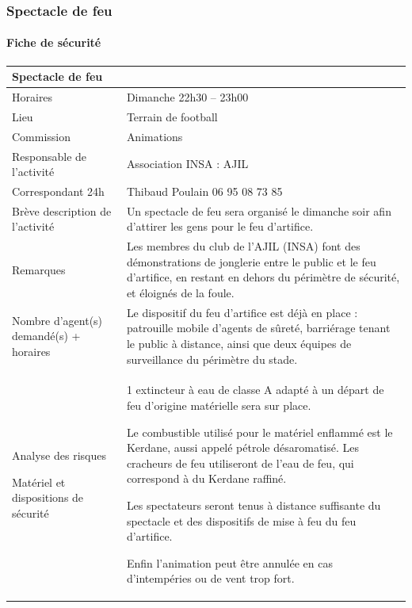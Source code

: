 \documentclass[hidelinks, paper=a4, fontsize=13pt]{report}
\begin{document}
\newpage

\subsubsection{Spectacle de feu}

\paragraph{Fiche de sécurité}
\begin{center}

\begin{tabular}{ | p{6cm} | p{10cm} | }
\hline
	\multicolumn{2}{|l|}{Spectacle de feu}  \\ \hline
	Horaires & Dimanche 22h30 – 23h00 \\ \hline
	Lieu & Terrain de football \\ \hline
	Commission & Animations \\ \hline
	Responsable de l'activité & Association INSA : AJIL \\ \hline
	Correspondant 24h & Thibaud Poulain 06 95 08 73 85 \\ \hline
	Brève description de l'activité & Un spectacle de feu sera organisé le dimanche soir afin d’attirer les gens pour le feu d’artifice. \\ \hline
	Remarques & Les membres du club de l’AJIL (INSA) font des démonstrations de jonglerie entre le public et le feu d’artifice, en restant en dehors du périmètre de sécurité, et éloignés de la foule. \\ \hline
	Nombre d’agent(s) demandé(s) + horaires
 & Le dispositif du feu d’artifice est déjà en place : patrouille mobile d’agents de sûreté, barriérage tenant le public à distance, ainsi que deux équipes de surveillance du périmètre du stade. \\ \hline
Analyse des risques

Matériel et dispositions de sécurité & 1 extincteur à eau de classe A adapté à un départ de feu d'origine matérielle sera sur place.

Le combustible utilisé pour le matériel enflammé est le Kerdane, aussi appelé pétrole désaromatisé. Les cracheurs de feu utiliseront de l'eau de feu, qui correspond à du Kerdane raffiné. 

Les spectateurs seront tenus à distance suffisante du spectacle et des dispositifs de mise à feu du feu d’artifice.

Enfin l’animation peut être annulée en cas d’intempéries ou de vent trop fort. \\ \hline
\end{tabular}
\end{center}
\end{document}
